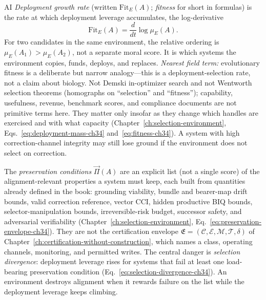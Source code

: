 \begin{authbar}{AI}
\emph{Deployment growth rate} (written \(\mathrm{Fit}_E(A)\); \emph{fitness} for short in formulas) is the rate at which deployment leverage accumulates, the log-derivative
\[
\mathrm{Fit}_E(A)
=
\frac{d}{dt}\log \mu_E(A).
\]
For two candidates in the same environment, the relative ordering is \(\mu_E(A_1)>\mu_E(A_2)\), not a separate moral score.
It is which systems the environment copies, funds, deploys, and replaces.
\emph{Nearest field term:} evolutionary fitness is a deliberate but narrow analogy---this is a deployment-selection rate, not a claim about biology.
Not Demski in-optimizer search and not Wentworth selection theorems (homographs on ``selection'' and ``fitness''); capability, usefulness, revenue, benchmark scores, and compliance documents are not primitive terms here.
They matter only insofar as they change which handles are exercised and with what capacity (Chapter~\ref{ch:selection-environment}, Eqs.~\eqref{eq:deployment-mass-ch34} and~\eqref{eq:fitness-ch34}).
A system with high correction-channel integrity may still lose ground if the environment does not select on correction.

The \emph{preservation conditions} \(\vec{\Pi}(A)\) are an explicit list (not a single score) of the alignment-relevant properties a system must keep, each built from quantities already defined in the book: grounding viability, bundle and bearer-map drift bounds, valid correction reference, vector \(\mathrm{CCI}\), hidden productive BIQ bounds, selector-manipulation bounds, irreversible-risk budget, successor safety, and adversarial verifiability (Chapter~\ref{ch:selection-environment}, Eq.~\eqref{eq:preservation-envelope-ch34}).
They are not the certification envelope \(\mathfrak{E}=(\mathcal{C},\mathcal{E},\mathcal{M},\mathcal{T},\delta)\) of Chapter~\ref{ch:certification-without-construction}, which names a class, operating channels, monitoring, and permitted writes.
The central danger is \emph{selection divergence}: deployment leverage rises for systems that fail at least one load-bearing preservation condition (Eq.~\eqref{eq:selection-divergence-ch34}).
An environment destroys alignment when it rewards failure on the list while the deployment leverage keeps climbing.

\end{authbar}
\authbarneedspace
